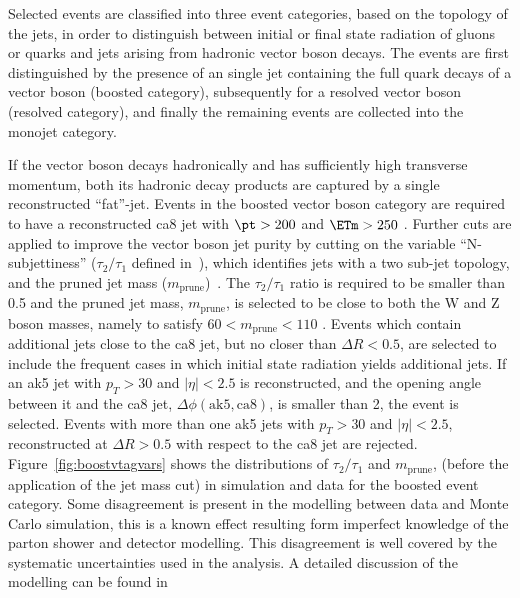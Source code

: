Selected events are classified into three event categories, based on the
topology of the jets, in order to distinguish between initial or final state
radiation of gluons or quarks and jets arising from hadronic vector boson
decays.  The events are first distinguished by the presence of an single jet
containing the full quark decays of a vector boson (boosted category),
subsequently for a resolved vector boson (resolved category), and finally the
remaining events are collected into the monojet category. 

If the vector boson decays hadronically and has sufficiently high transverse
momentum, both its hadronic decay products are captured by a single
reconstructed ``fat''-jet.  Events in the boosted vector boson category are
required to have a reconstructed ca8 jet with $\pt>200$ \gev and  $\ETm>250$
\gev.  Further cuts are applied to improve the vector boson jet purity by
cutting on the variable ``N-subjettiness'' ($\tau_2/\tau_1$ defined
in~\cite{Thaler:2010tr,Thaler:2011gf}), which identifies jets with a two sub-jet
topology, and the pruned jet mass ($m_{\mathrm{prune}}$)~\cite{Ellis:2009me}.
The $\tau_2/\tau_1$ ratio is required to be smaller than 0.5 and the pruned jet
mass, $m_{\mathrm{prune}}$, is selected to be close to both the W and Z boson
masses, namely to satisfy $60<m_{\mathrm{prune}}<110$ \gev.   Events which
contain additional jets close to the ca8 jet, but no closer than $\Delta R <
0.5$, are selected to include the frequent cases in which initial state
radiation yields additional jets.  If an ak5 jet with $p_T>30$ and $|\eta|<2.5$
is reconstructed, and the opening angle between it and the ca8 jet,
$\Delta\phi(\mathrm{ak5,ca8})$, is smaller than 2, the event is selected. Events
with more than one ak5 jets with $p_T>30$ \gev and $|\eta|<2.5$, reconstructed
at $\Delta R> 0.5$ with respect to the ca8 jet are rejected.
Figure~\ref{fig:boostvtagvars} shows the distributions of $\tau_2/\tau_1$ and
$m_{\mathrm{prune}}$, (before the application of the jet mass cut) in simulation
and data for the boosted event category. Some disagreement is present in the
modelling between data and Monte Carlo simulation, this is a known effect
resulting form imperfect knowledge of the parton shower and detector modelling.
This disagreement is well covered by the systematic uncertainties used in the
analysis. A detailed discussion of the modelling can be found in
